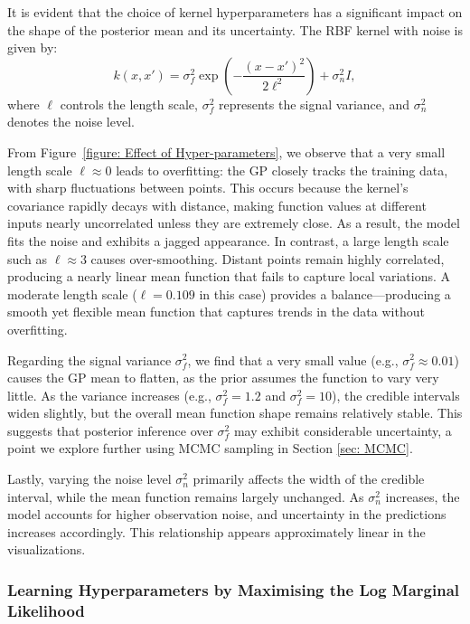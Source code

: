 \documentclass{article}
\begin{document}
\noindent
It is evident that the choice of kernel hyperparameters has a significant impact on the shape of the posterior mean and its uncertainty.
The RBF kernel with noise is given by:
\[
k(x, x') = \sigma_f^2 \exp\left( -\frac{(x - x')^2}{2\ell^2} \right) + \sigma_n^2 I,
\]
where $\ell$ controls the length scale, $\sigma_f^2$ represents the signal variance, and $\sigma_n^2$ denotes the noise level.

\noindent
From Figure~\ref{figure: Effect of Hyper-parameters}, we observe that a very small length scale $\ell \approx 0$ leads to overfitting:
the GP closely tracks the training data, with sharp fluctuations between points. This occurs because the kernel's covariance rapidly decays with distance,
making function values at different inputs nearly uncorrelated unless they are extremely close. As a result, the model fits the noise and exhibits a jagged appearance.
In contrast, a large length scale such as $\ell \approx 3$ causes over-smoothing. Distant points remain highly correlated,
producing a nearly linear mean function that fails to capture local variations. A moderate length scale ($\ell = 0.109$ in this case)
provides a balance—producing a smooth yet flexible mean function that captures trends in the data without overfitting.

\noindent
Regarding the signal variance $\sigma_f^2$, we find that a very small value (e.g., $\sigma_f^2 \approx 0.01$) causes the GP mean to flatten,
as the prior assumes the function to vary very little. As the variance increases (e.g., $\sigma_f^2 = 1.2$ and $\sigma_f^2 = 10$), the credible intervals widen slightly,
but the overall mean function shape remains relatively stable. This suggests that posterior inference over $\sigma_f^2$ may exhibit considerable uncertainty, a point we explore further using MCMC sampling in Section \ref{sec: MCMC}.


\noindent
Lastly, varying the noise level $\sigma_n^2$ primarily affects the width of the credible interval, 
while the mean function remains largely unchanged. As $\sigma_n^2$ increases, the model accounts for higher observation noise, 
and uncertainty in the predictions increases accordingly. This relationship appears approximately linear in the visualizations.


\subsubsection*{Learning Hyperparameters by Maximising the Log Marginal Likelihood}
\label{sec: hyperparam_optimisation}
\end{document}
